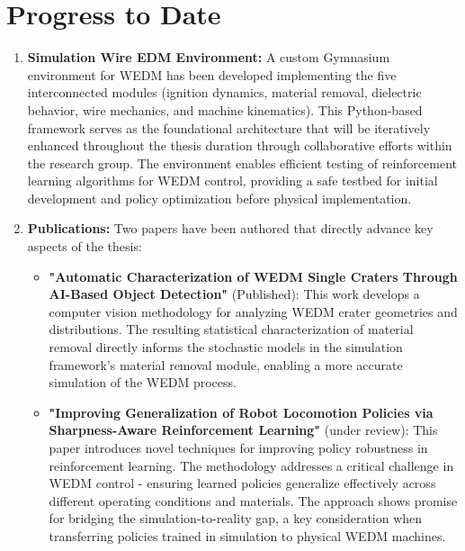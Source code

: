 \documentclass[11pt]{article}
\begin{document}
\section{Progress to Date}


\begin{enumerate}
    \item \textbf{Simulation Wire EDM Environment:} A custom Gymnasium environment for WEDM has been developed implementing the five interconnected modules (ignition dynamics, material removal, dielectric behavior, wire mechanics, and machine kinematics). This Python-based framework serves as the foundational architecture that will be iteratively enhanced throughout the thesis duration through collaborative efforts within the research group. The environment enables efficient testing of reinforcement learning algorithms for WEDM control, providing a safe testbed for initial development and policy optimization before physical implementation.

    \item \textbf{Publications:} Two papers have been authored that directly advance key aspects of the thesis:
    \begin{itemize}
        \item \textbf{"Automatic Characterization of WEDM Single Craters Through AI-Based Object Detection"} \cite{Gonzalez-Sanchez_2024ijat} (Published): This work develops a computer vision methodology for analyzing WEDM crater geometries and distributions. The resulting statistical characterization of material removal directly informs the stochastic models in the simulation framework's material removal module, enabling a more accurate simulation of the WEDM process.
        
        \item \textbf{"Improving Generalization of Robot Locomotion Policies via Sharpness-Aware Reinforcement Learning"} (under review): This paper introduces novel techniques for improving policy robustness in reinforcement learning. The methodology addresses a critical challenge in WEDM control - ensuring learned policies generalize effectively across different operating conditions and materials. The approach shows promise for bridging the simulation-to-reality gap, a key consideration when transferring policies trained in simulation to physical WEDM machines.

    \end{itemize}

\end{enumerate}
\end{document}
